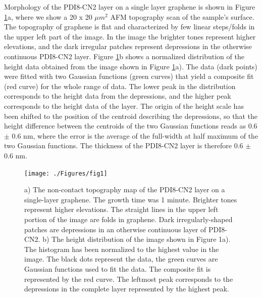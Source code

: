 \documentclass[review]{elsarticle}
\begin{document}
Morphology of the PDI8-CN2 layer on a single layer graphene is shown in Figure \ref{fig:1}a, where we show a 20 x 20 $\mu m^2$ AFM topography scan of the sample's surface.
The topography of graphene is flat and characterized by few linear steps/folds in the upper left part of the image.
 In the image the brighter tones represent higher elevations, and the dark irregular patches represent depressions in the otherwise continuous PDI8-CN2 layer.
 Figure \ref{fig:1}b  shows a normalized distribution of the height data obtained from the image shown in Figure \ref{fig:1}a).
 The data (dark points) were fitted with two Gaussian functions (green curves) that yield a composite fit (red curve) for the whole range of data.
 The lower peak in the distribution corresponds to the height data from the depressions, and the higher peak corresponds to the height data of the layer.
 The origin of the height scale has been shifted to the position of the centroid describing the depressions, so that the height difference between the centroids of the two Gaussian functions reads as 0.6 $\pm$ 0.6 nm, where the error is the average of the full-width at half maximum of the two Gaussian functions.
  The thickness of the PDI8-CN2 layer is therefore 0.6 $\pm$ 0.6 nm.


\begin{figure}[htb]
  \centering
        \texttt{[image: ./Figures/fig1]}
  \caption{a) The non-contact topography map of the PDI8-CN2 layer on a single-layer graphene.
 The growth time was 1 minute.
 Brighter tones represent higher elevations.
 The straight lines in the upper left portion of the image are folds in graphene.
 Dark irregularly-shaped patches are depressions in an otherwise continuous layer of PDI8-CN2.
  b) The height distribution of the image shown in Figure 1a).
 The histogram has been normalized to the highest value in the image.
 The black dots represent the data, the green curves are Gaussian functions used to fit the data.
 The composite fit is represented by the red curve.
 The leftmost peak corresponds to the depressions in the complete layer represented by the highest peak.
}
  \label{fig:1}
\end{figure}
\end{document}
